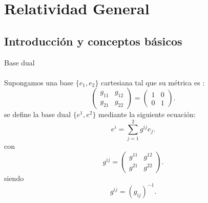 \chapter{Relatividad General}
\section{Introducción y conceptos básicos}

\begin{mydef}
Base dual \\
\\
Supongamos una base $\lbrace e_1,e_2\rbrace$ cartesiana tal que su métrica es :
\[ \begin{pmatrix}
        g_{11} & g_{12}  \\ 
        g_{21} & g_{22}
    \end{pmatrix} =
    \begin{pmatrix} 1 & 0 \\ 0 & 1 \end{pmatrix} 
.\] 
se define la base dual $\lbrace e^1,e^2 \rbrace$ mediante la siguiente ecuación:
\[
    e^i= \sum_{j=1}^{2} g^{ij}e_j
.\] 
con \[
    g^{ij}= \begin{pmatrix} g^{11} & g^{12}  \\ g^{21} & g^{22} \end{pmatrix} 
.\]
siendo 
\[
    g^{ij}= \left( g_{ij} \right) ^{-1}
.\] 

\end{mydef}

